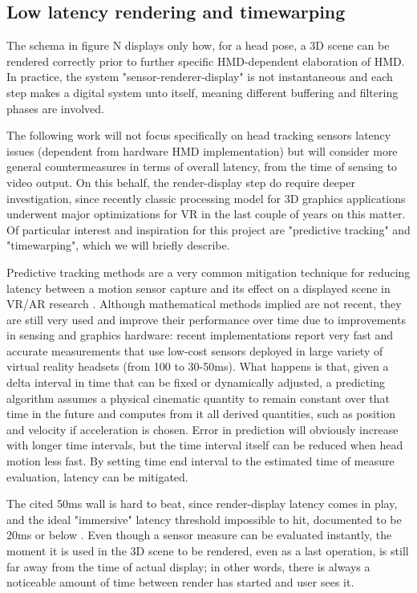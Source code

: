 \subsection{Low latency rendering and timewarping}
The schema in figure N displays only how, for a head pose, a 3D scene can be rendered correctly prior to further specific HMD-dependent elaboration of HMD. In practice, the system "sensor-renderer-display" is not instantaneous and each step makes a digital system unto itself, meaning different buffering and filtering phases are involved.

The following work will not focus specifically on head tracking sensors latency issues (dependent from hardware HMD implementation) but will consider more general countermeasures in terms of overall latency, from the time of sensing to video output. On this behalf, the render-display step do require deeper investigation, since recently classic processing model for 3D graphics applications underwent major optimizations for VR in the last couple of years on this matter. Of particular interest and inspiration for this project are "predictive tracking" and "timewarping", which we will briefly describe.

Predictive tracking methods are a very common mitigation technique for reducing latency between a motion sensor capture and its effect on a displayed scene in VR/AR research \cite{oculus_prediction}. Although mathematical methods implied are not recent, they are still very used and improve their performance over time due to improvements in sensing and graphics hardware: recent implementations report very fast and accurate measurements that use low-cost sensors deployed in large variety of virtual reality headsets (from 100 to 30-50ms)\cite{oculus_prediction}. What happens is that, given a delta interval in time that can be fixed or dynamically adjusted, a predicting algorithm assumes a physical cinematic quantity to remain constant over that time in the future and computes from it all derived quantities, such as position and velocity if acceleration is chosen. Error in prediction will obviously increase with longer time intervals, but the time interval itself can be reduced when head motion less fast. By setting time end interval to the estimated time of measure evaluation, latency can be mitigated.

The cited 50ms wall is hard to beat, since render-display latency comes in play, and the ideal "immersive" latency threshold impossible to hit, documented to be 20ms or below \cite{latency_sinequanon}. Even though a sensor measure can be evaluated instantly, the moment it is used in the 3D scene to be rendered, even as a last operation, is still far away from the time of actual display; in other words, there is always a noticeable amount of time between render has started and user sees it.

